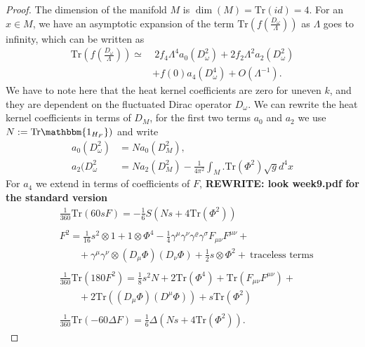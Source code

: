 \begin{proof}
     The dimension of the manifold $M$ is $\dim(M) = \text{Tr}(id) =4$. For
     an $x \in M$, we have an asymptotic expansion of the term
     $\text{Tr}(f(\frac{D_\omega}{\Lambda}))$ as $\Lambda$ goes to infinity,
     which can be written as
     \begin{align}\label{eq:trheatkernel}
         \text{Tr}(f(\frac{D_\omega}{\Lambda})) \simeq& \ 2f_4 \Lambda ^4
         a_0(D_\omega ^2)+ 2f_2\Lambda^2 a_2(D_\omega^2) \\&+ f(0) a_4(D_\omega^4)
         +O(\Lambda^{-1}).
     \end{align}
     We have to note here that the heat kernel coefficients are zero for uneven $k$,
     and they are dependent on the fluctuated Dirac operator
     $D_\omega$. We can rewrite the heat kernel coefficients in terms of $D_M$,
     for the first two terms $a_0$ and $a_2$ we use $N:=
     \text{Tr}\mathbbm{1_{H_F}})$ and write
     \begin{align}
         a_0(D_\omega^2) &= Na_0(D_M^2),\\
         a_2(D_\omega^2 &= Na_2(D_M^2) - \frac{1}{4\pi^2}\int_M.
         \text{Tr}(\Phi^2)\sqrt{g}d^4x
     \end{align}
     For $a_4$ we extend in terms of coefficients of $F$, \textbf{REWRITE: look week9.pdf
     for the standard version}
     \begin{align}
         &\frac{1}{360}\text{Tr}(60sF)= -\frac{1}{6}S(Ns + 4
         \text{Tr}(\Phi^2))\\
        \nonumber\\
         &F^2 = \frac{1}{16}s^2\otimes 1 + 1\otimes \Phi^4 - \frac{1}{4}
         \gamma^\mu\gamma^\nu \gamma^\varrho\gamma^\sigma F_{\mu\nu}F^{\mu\nu}+\\
         &\;\;\;\;\;\;\;+\gamma^\mu\gamma^\nu\otimes(D_\mu\Phi)(D_\nu
         \Phi)+\frac{1}{2}s\otimes \Phi^2 + \ \text{traceless terms}\\
         \nonumber\\
         &\frac{1}{360}\text{Tr}(180F^2) = \frac{1}{8}s^2N + 2\text{Tr}(\Phi^4)
         + \text{Tr}(F_{\mu\nu}F^{\mu\nu}) +\\
         &\;\;\;\;\;\;\;+2\text{Tr}((D_\mu\Phi)(D^\mu\Phi))
         + s\text{Tr}(\Phi^2)\\
         \nonumber\\
         &\frac{1}{360}\text{Tr}(-60\Delta F)=
         \frac{1}{6}\Delta(Ns+4\text{Tr}(\Phi^2)).
     \end{align}

\end{proof}
